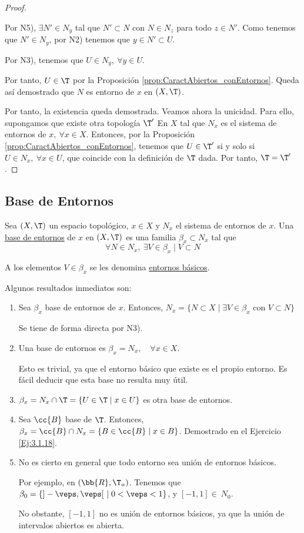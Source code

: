 \begin{proof}
\begin{description}
        Por N5), $\exists N'\in N_y$ tal que $N'\subset N$ con $N\in N_z$ para todo $z\in N'$. Como tenemos que $N'\in N_y$, por N2) tenemos que $y\in N'\subset U$.
        
        Por N3), tenemos que $U\in N_y,~\forall y\in U$.
        
        Por tanto, $U\in \T$ por la Proposición \ref{prop:CaractAbiertos_conEntornos}. Queda así demostrado que $N$ es entorno de $x$ en $(X,\T)$.
    \end{description}

    Por tanto, la existencia queda demostrada. Veamos ahora la unicidad. Para ello, supongamos que existe otra topología $\T'$ En $X$ tal que $N_x$ es el sistema de entornos de $x, ~\forall x\in X$. Entonces, por la Proposición \ref{prop:CaractAbiertos_conEntornos}, tenemos que $U\in \T'$ si y solo si $U\in N_x,~\forall x\in U$, que coincide con la definición de $\T$ dada. Por tanto, $\T=\T'$.
\end{proof}

\subsection{Base de Entornos}
\begin{definicion}
    Sea $(X,\T)$ un espacio topológico, $x\in X$ y $N_x$ el sistema de entornos de $x$. Una \ul{base de entornos} de $x$ en $(X,\T)$ es una familia $\beta_x\subset N_x$ tal que 
    $$\forall N\in N_x,~\exists V\in \beta_x \mid V\subset N$$

    A los elementos $V\in \beta_x$ se les denomina \ul{entornos básicos}.
\end{definicion}


Algunos resultados inmediatos son:
\begin{enumerate}
    \item Sea $\beta_x$ base de entornos de $x$. Entonces, $N_x=\{N\subset X\mid \exists V\in \beta_x\text{ con } V\subset N\}$

    Se tiene de forma directa por N3).

    \item Una base de entornos es $\beta_x=N_x, \quad \forall x\in X$.

    Esto es trivial, ya que el entorno básico que existe es el propio entorno. Es fácil deducir que esta base no resulta muy útil.
    
    \item $\beta_x=N_x\cap \T=\{U\in \T\mid x\in U\}$ es otra base de entornos.
    
    \item Sea $\cc{B}$ base de $\T$. Entonces, $\beta_x=\cc{B}\cap N_x=\{B\in \cc{B}\mid x\in B\}$. Demostrado en el Ejercicio \ref{Ej:3.1.18}.
    \item No es cierto en general que todo entorno sea unión de entornos básicos.

    Por ejemplo, en $(\bb{R}, \T_u)$. Tenemos que $\beta_0=\{]-\veps, \veps[~\mid 0<\veps<1\}$, y $[-1,1]\in~N_0$.

    No obstante, $[-1,1]$ no es unión de entornos básicos, ya que la unión de intervalos abiertos es abierta.
\end{enumerate}

